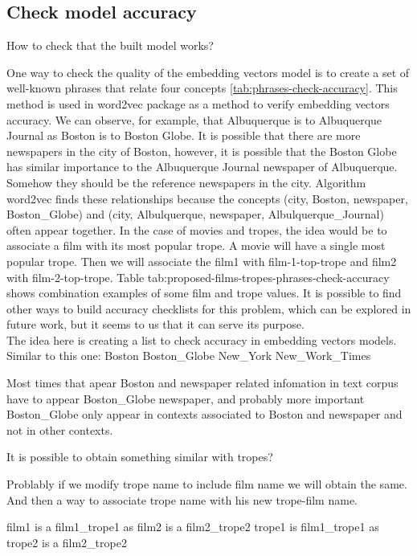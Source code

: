 \documentclass[letterpaper]{article}
\begin{document}
	\subsection{Check model accuracy}
	How to check that the built model works?
	
	One way to check the quality of the embedding vectors model is to create a set of 
	well-known phrases that relate four concepts \ref{tab:phrases-check-accuracy}. This method is used in word2vec package \cite{mikolov2013} as a method to verify 
	embedding vectors accuracy. We can observe, for example, that Albuquerque is to Albuquerque Journal
	as Boston is to Boston Globe. It is possible that there are more newspapers in the city of Boston, however, it is possible that the Boston Globe has similar importance to the Albuquerque Journal newspaper of Albuquerque. Somehow they should be the reference newspapers in the city. Algorithm word2vec finds these relationships because the concepts (city, Boston, newspaper, Boston\_Globe) and (city, Albulquerque, newspaper, Albulquerque\_Journal) often appear together. 
	In the case of movies and tropes, the idea would be to associate a film with its most popular trope. A movie will have a single most popular trope. 
	Then we will associate the film1 with film-1-top-trope and film2 with film-2-top-trope. Table tab:proposed-films-tropes-phrases-check-accuracy shows combination examples of some film and trope values. It is possible to find other ways to build accuracy checklists for this problem, which can be explored in future work,
	but it seems to us that it can serve its purpose.\\
	
	The idea here is creating a list to check accuracy in embedding vectors models.
	Similar to this one:
	Boston Boston\_Globe New\_York New\_Work\_Times
	
	Most times that apear Boston and newspaper related infomation in text corpus have to appear Boston\_Globe newspaper, and probably more important Boston\_Globe only appear in contexts associated to Boston and newspaper and not in other contexts.
	
	It is possible to obtain something similar with tropes?
	
	Problably if we modify trope name to include film name we will obtain the same. And then a way to associate trope name with his new trope-film name.
	
	film1 is a film1\_trope1 as film2 is a film2\_trope2
	trope1 is film1\_trope1 as trope2 is a film2\_trope2
	
\end{document}
